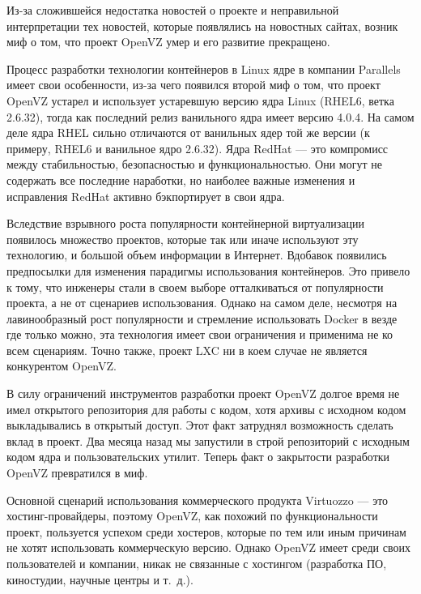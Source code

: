 \documentclass[10pt, a5paper]{article}
\begin{document}
Из-за сложившейся недостатка новостей о проекте и неправильной интерпретации тех новостей, которые появлялись на новостных сайтах, возник миф о том, что проект OpenVZ умер и его развитие прекращено.

Процесс разработки технологии контейнеров в Linux ядре в компании Parallels имеет свои особенности, из-за чего появился второй миф о том, что проект OpenVZ устарел и использует устаревшую версию ядра Linux (RHEL6, ветка 2.6.32), тогда как последний релиз ванильного ядра имеет версию 4.0.4. На самом деле ядра RHEL сильно отличаются от ванильных ядер той же версии (к примеру, RHEL6 и ванильное ядро 2.6.32). Ядра RedHat --- это компромисс между стабильностью, безопасностью и функциональностью. Они могут не содержать все последние наработки, но наиболее важные изменения и исправления RedHat активно бэкпортирует в свои ядра.

Вследствие взрывного роста популярности контейнерной виртуализации появилось множество проектов, которые так или иначе используют эту технологию, и большой объем информации в Интернет. Вдобавок появились предпосылки для изменения парадигмы использования контейнеров. Это привело к тому, что инженеры стали в своем выборе отталкиваться от популярности проекта, а не от сценариев использования. Однако на самом деле, несмотря на лавинообразный рост популярности и стремление использовать Docker в везде где только можно, эта технология имеет свои ограничения и применима не ко всем сценариям. Точно также, проект LXC ни в коем случае не является конкурентом OpenVZ.

В силу ограничений инструментов разработки проект OpenVZ долгое время не имел открытого репозитория для работы с кодом, хотя архивы с исходном кодом выкладывались в открытый доступ. Этот факт затруднял возможность сделать вклад в проект. Два месяца назад мы запустили в строй репозиторий с исходным кодом ядра и пользовательских утилит. Теперь факт о закрытости разработки OpenVZ превратился в миф.

Основной сценарий использования коммерческого продукта \linebreak Virtuozzo --- это хостинг-провайдеры, поэтому OpenVZ, как похожий по функциональности проект, пользуется успехом среди хостеров, которые по тем или иным причинам не хотят использовать коммерческую версию. Однако OpenVZ имеет среди своих пользователей и компании, никак не связанные с хостингом (разработка ПО, киностудии, научные центры и т.~д.). 
\end{document}

